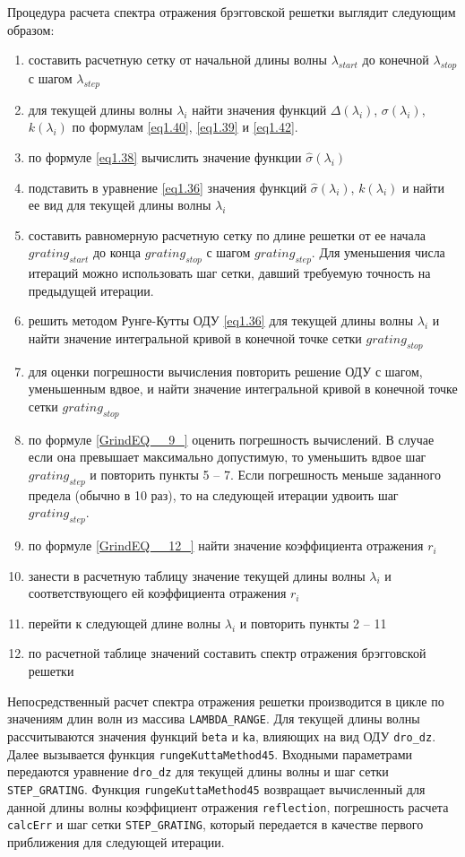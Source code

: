 Процедура расчета спектра отражения брэгговской решетки выглядит следующим образом:
\begin{enumerate}
\item составить расчетную сетку от начальной длины волны $\lambda_{start}$ до конечной $\lambda_{stop}$  с шагом $\lambda_{step}$
\item для текущей длины волны $\lambda_{i}$  найти значения функций $\Delta(\lambda_{i})$, $\sigma(\lambda_{i})$, $k(\lambda_{i})$ по формулам \eqref{eq1.40}, \eqref{eq1.39} и \eqref{eq1.42}.
\item по формуле  \eqref{eq1.38} вычислить значение функции $\hat\sigma(\lambda_{i})$
\item подставить в уравнение \eqref{eq1.36} значения функций $\hat\sigma(\lambda_{i})$,  $k(\lambda_{i})$ и найти ее вид для текущей длины волны $\lambda_{i}$
\item составить равномерную расчетную сетку по длине решетки от ее начала $grating_{start}$ до конца $grating_{stop}$ с шагом $grating_{step}$. Для уменьшения числа итераций можно использовать шаг сетки, давший требуемую точность на предыдущей итерации.
\item решить методом Рунге-Кутты ОДУ \eqref{eq1.36} для текущей длины волны $\lambda_{i}$ и найти значение интегральной кривой в конечной точке сетки $grating_{stop}$
\item для оценки погрешности вычисления повторить решение ОДУ с шагом, уменьшенным вдвое, и найти значение интегральной кривой в конечной точке сетки $grating_{stop}$
\item по формуле \eqref{GrindEQ__9_} оценить погрешность вычислений. В случае если она превышает максимально допустимую, то уменьшить вдвое шаг $grating_{step}$ и повторить пункты 5 -- 7. Если погрешность меньше заданного предела (обычно в 10 раз), то на следующей итерации удвоить шаг $grating_{step}$.
\item по формуле \eqref{GrindEQ__12_} найти значение коэффициента отражения $r_i$
\item занести в расчетную таблицу значение текущей длины волны $\lambda_{i}$  и соответствующего ей коэффициента отражения $r_i$
\item перейти к следующей длине волны $\lambda_{i}$  и повторить пункты 2 -- 11
\item по расчетной таблице значений составить спектр отражения брэгговской решетки
\end{enumerate}

Непосредственный расчет спектра отражения решетки производится в цикле по значениям длин волн из массива \texttt{LAMBDA\_RANGE}. Для текущей длины волны рассчитываются значения функций \texttt{beta} и \texttt{ka}, влияющих на вид ОДУ \texttt{dro\_dz}. Далее вызывается функция \texttt{rungeKuttaMethod45}. Входными параметрами передаются уравнение \texttt{dro\_dz} для текущей длины волны и шаг сетки \texttt{STEP\_GRATING}. Функция \texttt{rungeKuttaMethod45} возвращает вычисленный для данной длины волны коэффициент отражения \texttt{reflection}, погрешность расчета \texttt{calcErr} и шаг сетки \texttt{STEP\_GRATING}, который передается в качестве первого приближения для следующей итерации.

